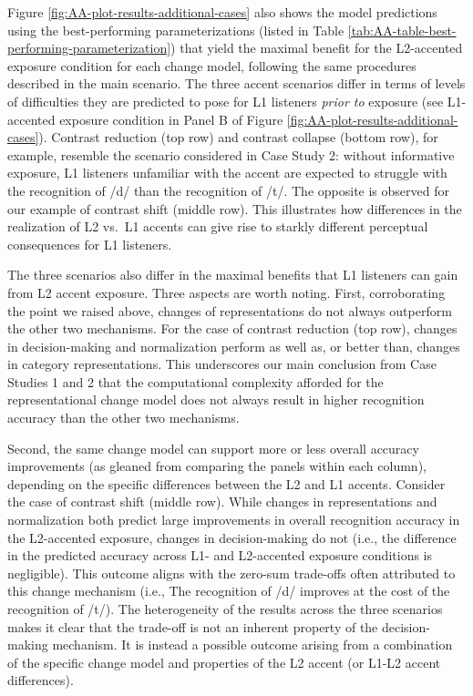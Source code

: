 \documentclass[
  11pt,
  english,
  man,floatsintext]{apa6}
\begin{document}
Figure \ref{fig:AA-plot-results-additional-cases} also shows the model predictions using the best-performing parameterizations (listed in Table \ref{tab:AA-table-best-performing-parameterization}) that yield the maximal benefit for the L2-accented exposure condition for each change model, following the same procedures described in the main scenario. The three accent scenarios differ in terms of levels of difficulties they are predicted to pose for L1 listeners \emph{prior to} exposure (see L1-accented exposure condition in Panel B of Figure \ref{fig:AA-plot-results-additional-cases}). Contrast reduction (top row) and contrast collapse (bottom row), for example, resemble the scenario considered in Case Study 2: without informative exposure, L1 listeners unfamiliar with the accent are expected to struggle with the recognition of /d/ than the recognition of /t/. The opposite is observed for our example of contrast shift (middle row). This illustrates how differences in the realization of L2 vs.~L1 accents can give rise to starkly different perceptual consequences for L1 listeners.

The three scenarios also differ in the maximal benefits that L1 listeners can gain from L2 accent exposure. Three aspects are worth noting. First, corroborating the point we raised above, changes of representations do not always outperform the other two mechanisms. For the case of contrast reduction (top row), changes in decision-making and normalization perform as well as, or better than, changes in category representations. This underscores our main conclusion from Case Studies 1 and 2 that the computational complexity afforded for the representational change model does not always result in higher recognition accuracy than the other two mechanisms.

Second, the same change model can support more or less overall accuracy improvements (as gleaned from comparing the panels within each column), depending on the specific differences between the L2 and L1 accents. Consider the case of contrast shift (middle row). While changes in representations and normalization both predict large improvements in overall recognition accuracy in the L2-accented exposure, changes in decision-making do not (i.e., the difference in the predicted accuracy across L1- and L2-accented exposure conditions is negligible). This outcome aligns with the zero-sum trade-offs often attributed to this change mechanism (i.e., The recognition of /d/ improves at the cost of the recognition of /t/). The heterogeneity of the results across the three scenarios makes it clear that the trade-off is not an inherent property of the decision-making mechanism. It is instead a possible outcome arising from a combination of the specific change model and properties of the L2 accent (or L1-L2 accent differences).
\end{document}
